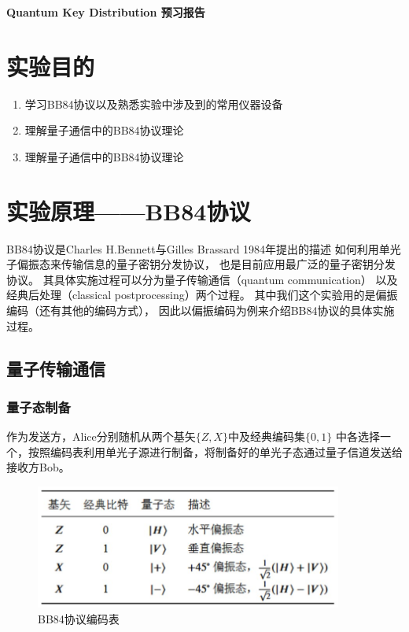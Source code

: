 \documentclass[a4paper,UTF8]{ctexart}
\begin{document}
\begin{center}
    \textbf{\Large Quantum Key Distribution 预习报告}
    \par {}
\end{center}

\section{实验目的}

\begin{enumerate}
    \item 学习BB84协议以及熟悉实验中涉及到的常用仪器设备
    \item 理解量子通信中的BB84协议理论
    \item 理解量子通信中的BB84协议理论
\end{enumerate}

\section{实验原理——BB84协议}

BB84协议是Charles H.Bennett与Gilles Brassard 1984年提出的描述
如何利用单光子偏振态来传输信息的量子密钥分发协议，
也是目前应用最广泛的量子密钥分发协议。
其具体实施过程可以分为量子传输通信（quantum communication）
以及经典后处理（classical postprocessing）两个过程。
其中我们这个实验用的是偏振编码（还有其他的编码方式），
因此以偏振编码为例来介绍BB84协议的具体实施过程。

\subsection{量子传输通信}

\subsubsection{量子态制备}

作为发送方，Alice分别随机从两个基矢$\{Z,X\}$中及经典编码集$\{0,1\}$
中各选择一个，按照编码表利用单光子源进行制备，将制备好的单光子态通过量子信道发送给接收方Bob。

\begin{figure}[H]
    \centering
    \begin{minipage}[b]{0.9\textwidth}
        \centering
        \includegraphics[width=0.9\textwidth]{./fig1.jpg}
        \caption{BB84协议编码表}
    \end{minipage}
\end{figure}
\end{document}

